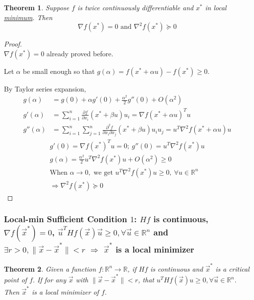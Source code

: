 \documentclass[11pt,a4paper]{article}
\newtheorem{theorem}{Theorem}
\begin{document}
\begin{theorem}
Suppose $f$ is twice continuously differentiable and $x^*$ in local \underline{minimum}. Then $$\nabla f(x^*)=0\text{ and }\nabla^2 f(x^*)\succeq 0$$
\end{theorem}
\begin{proof}
\quad\\
$\nabla f(x^*)=0$ already proved before.

Let $\alpha$ be small enough so that $g(\alpha)=f(x^*+\alpha u)-f(x^*)\geq 0$.

By Taylor series expansion,
\begin{equation}
    \begin{aligned}
        g(\alpha)&=g(0)+\alpha g'(0)+\frac{\alpha^2}{2}g''(0)+O(\alpha^2)\\
        g'(\alpha)&=\sum_{i=1}^n \frac{\partial f}{\partial x_i}(x^*+\beta u)u_i=\nabla f(x^*+\alpha u)^T u\\
        g''(\alpha)&=\sum_{i=1}^n\sum_{j=1}^n \frac{\partial^2 f}{\partial x_i\partial x_j}(x^*+\beta u)u_iu_j=u^T\nabla^2 f(x^*+\alpha u) u
    \end{aligned}
    \nonumber
\end{equation}
\begin{equation}
    \begin{aligned}
        g'(0)=\nabla f(x^*)^T u=0;\ g''(0)=u^T\nabla^2 f(x^*) u\\
        g(\alpha)=\frac{\alpha^2}{2}u^T\nabla^2 f(x^*) u+O(\alpha^2)\geq 0\\
        \text{When }\alpha \rightarrow 0,\text{ we get } u^T\nabla^2 f(x^*) u\geq 0,\ \forall u\in \mathbb{R}^n\\
        \Rightarrow	\nabla^2 f(x^*)\succeq 0
    \end{aligned}
    \nonumber
\end{equation}
\end{proof}


\subsubsection{Local-min Sufficient Condition $1$: $Hf$ is continuous, $\nabla f(\vec{x}^*)=0$, $\vec{u}^T Hf(\vec{x}) \vec{u}\geq 0,\forall \vec{u}\in \mathbb{R}^n$ and $\exists r>0, \|\vec{x}-\vec{x}^*\|<r$ $\Rightarrow$ $\vec{x}^*$ is a local minimizer}
\begin{theorem}
    Given a function $f:\mathbb{R}^n \rightarrow \mathbb{R}$, if $Hf$ is continuous and $\vec{x}^*$ is a critical point of
    $f$. If for any $\vec{x}$ with $\|\vec{x}-\vec{x}^*\|<r$, that $u^T Hf(\vec{x}) u\geq 0, \forall \vec{u}\in \mathbb{R}^n$. Then $\vec{x}^*$ is a local minimizer of $f$.
\end{theorem}
\end{document}

